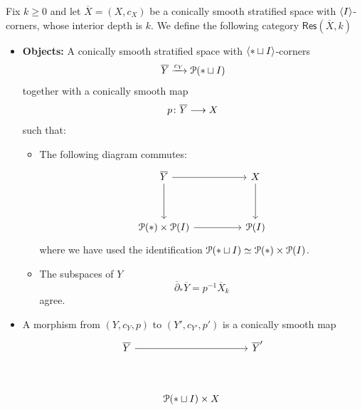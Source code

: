 \begin{definition}\cite[Definition~7.3.2]{AFT1}
    Fix $k \geq 0$ and let $\overline{X} = (X,c_X)$ be a conically smooth stratified space with $\langle I \rangle$-corners, whose interior depth is $k$. We define the following category $\mathsf{Res}(\overline{X},k)$
    \begin{itemize}
        \item \textbf{Objects:} A conically smooth stratified space with $\langle * \sqcup I \rangle$-corners 
        \begin{equation}
            \overline{Y} \xrightarrow{c_{Y}} \mathcal P(*\sqcup I)
        \end{equation} 
        together with a conically smooth map 
        \begin{equation}
            p \colon \overline{Y} \longrightarrow X
        \end{equation}
        such that:
        \begin{itemize}
            \item The following diagram commutes:
            \begin{equation}
                \begin{tikzcd}[ampersand replacement=\&]
                    {\overline{Y}} \&\& X \\
                    \\
                    {\cP(*)\times \cP(I)} \&\& {\cP(I)}
                    \arrow[from=1-1, to=1-3]
                    \arrow[from=1-1, to=3-1]
                    \arrow[from=1-3, to=3-3]
                    \arrow[from=3-1, to=3-3]
                \end{tikzcd}
            \end{equation}
            where we have used the identification $\mathcal P(*\sqcup I) \simeq \mathcal P(*) \times \mathcal P(I)$.
            \item The subspaces of $Y$ \[\overline{\partial}_* \overline{Y} = p^{-1}\overline{X}_{k}\]
            agree.
        \end{itemize}
        \item A morphism from $(Y,c_{Y},p)$ to $(Y',c_{Y'},p')$ is a conically smooth map 
        \begin{equation}
            \begin{tikzcd}[ampersand replacement=\&]
                {\overline{Y}} \&\& {\overline{Y}'} \\
                \\
                \& {\cP(*\sqcup I)\times X}
                \arrow[from=1-1, to=1-3]

\end{tikzcd}
\end{equation}
\end{itemize}
\end{definition}
